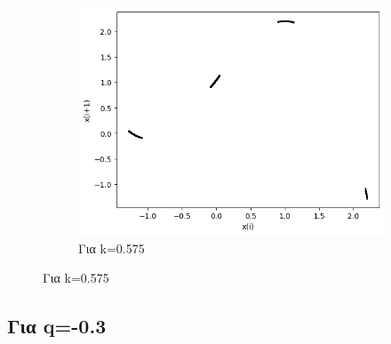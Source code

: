 \begin{figure}[h!]
\begin{subfigure}[b]{0.25\textwidth}
		\includegraphics[width=\textwidth]{LateX images/graphs/k0575}
		\caption{Για k=0.575}
		\label{f:k14}
	\end{subfigure}

\end{figure}

 \clearpage
\subsection{Για q=-0.3}

